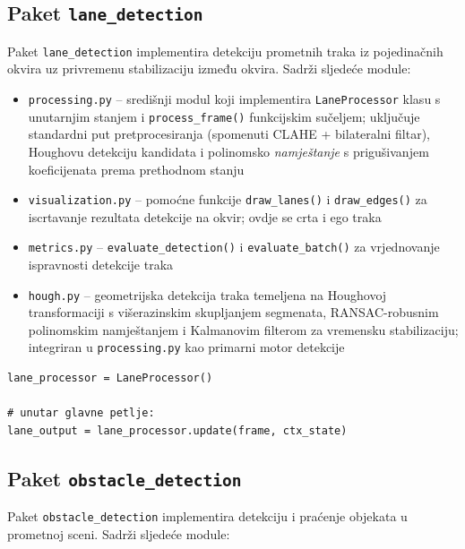 \subsection{Paket \texttt{lane\_detection}}

Paket \texttt{lane\_detection} implementira detekciju prometnih traka iz pojedinačnih okvira uz privremenu stabilizaciju između okvira. Sadrži sljedeće module:

\begin{itemize}
    \item \texttt{processing.py} -- središnji modul koji implementira \texttt{LaneProcessor} klasu s unutarnjim stanjem i \texttt{process\_frame()} funkcijskim sučeljem; uključuje standardni put pretprocesiranja (spomenuti CLAHE + bilateralni filtar), Houghovu detekciju kandidata i polinomsko \textit{namještanje} s prigušivanjem koeficijenata prema prethodnom stanju
    \item \texttt{visualization.py} -- pomoćne funkcije \texttt{draw\_lanes()} i \texttt{draw\_edges()} za iscrtavanje rezultata detekcije na okvir; ovdje se crta i ego traka
    \item \texttt{metrics.py} -- \texttt{evaluate\_detection()} i \texttt{evaluate\_batch()} za vrjednovanje ispravnosti detekcije traka
    \item \texttt{hough.py} -- geometrijska detekcija traka temeljena na Houghovoj transformaciji s višerazinskim skupljanjem segmenata, RANSAC-robusnim polinomskim namještanjem i Kalmanovim filterom za vremensku stabilizaciju; integriran u \texttt{processing.py} kao primarni motor detekcije
\end{itemize}

\begin{lstlisting}[style=pycode, caption={Poziv detekcije traka unutar glavne petlje}, label={lst:lane_proc}]
lane_processor = LaneProcessor()

# unutar glavne petlje:
lane_output = lane_processor.update(frame, ctx_state)
\end{lstlisting}

\subsection{Paket \texttt{obstacle\_detection}}

Paket \texttt{obstacle\_detection} implementira detekciju i praćenje objekata u prometnoj sceni. Sadrži sljedeće module:

